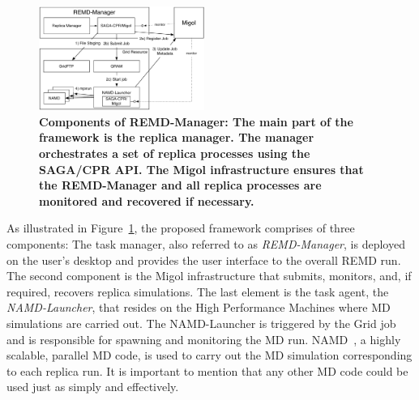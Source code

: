 \documentclass[conference,final]{IEEEtran}
\newcommand{\up}{\vspace*{-1em}}
\newcommand{\upp}{\vspace*{-0.5em}}
\begin{document}
\begin{figure}[ht]
      \centering
          \includegraphics[width=0.48\textwidth]{REMDgManager-architecture.pdf}
          \up\upp
          \caption{\footnotesize \bf Components of REMD-Manager: The main part of the
            framework is the replica manager. The manager orchestrates
            a set of replica processes using the SAGA/CPR API. The
            Migol infrastructure ensures that the REMD-Manager and all
            replica processes are monitored and recovered if
            necessary.}
            \upp
      \label{fig:REMD-Manager-architecture}
\end{figure}

As illustrated in Figure~\ref{fig:REMD-Manager-architecture}, the
proposed framework comprises of three components: The task manager,
also referred to as \emph{REMD-Manager}, is deployed on the user's
desktop and provides the user interface to the overall REMD
run. The second component is the Migol infrastructure that submits,
monitors, and, if required, recovers replica simulations.  The last
element is the task agent, the \emph{NAMD-Launcher}, that resides on
the High Performance Machines where MD simulations are carried
out. The NAMD-Launcher is triggered by the Grid job and is responsible
for spawning and monitoring the MD
run. NAMD~\cite{Phillips:2005gd}, a highly scalable, parallel MD code,
is used to carry out the MD simulation corresponding to each
replica run. It is important to mention that any other MD 
code could be used just as simply and effectively.

\end{document}

